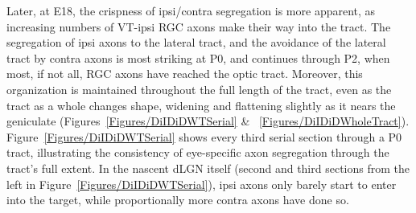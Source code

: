 Later, at E18, the crispness of ipsi/contra segregation is more apparent, as increasing numbers of VT-ipsi RGC axons make their way into the tract.
The segregation of ipsi axons to the lateral tract, and the avoidance of the lateral tract by contra axons is most striking at P0, and continues through P2, when most, if not all, RGC axons have reached the optic tract.
Moreover, this organization is maintained throughout the full length of the tract, even as the tract as a whole changes shape, widening and flattening slightly as it nears the geniculate (Figures~\ref{Figures/DiIDiDWTSerial} \& ~\ref{Figures/DiIDiDWholeTract}).
Figure~\ref{Figures/DiIDiDWTSerial} shows every third serial section through a P0 tract, illustrating the consistency of eye-specific axon segregation through the tract's full extent.
In the nascent dLGN itself (second and third sections from the left in Figure~\ref{Figures/DiIDiDWTSerial}), ipsi axons only barely start to enter into the target, while proportionally more contra axons have done so.

